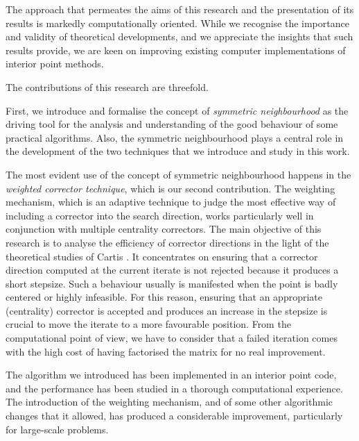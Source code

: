 The approach that permeates the aims of this research and 
the presentation of its results is markedly computationally oriented. 
While we recognise the importance and validity of theoretical developments, 
and we appreciate the insights that such results provide, 
we are keen on improving existing computer implementations of 
interior point methods.

The contributions of this research are threefold.

First, we introduce and formalise the concept of 
{\em symmetric neighbourhood} as the
driving tool for the analysis and understanding of the good behaviour
of some practical algorithms. 
Also, the symmetric neighbourhood plays a central role in the development 
of the two techniques that we introduce and study in this work.

The most evident use of the concept of symmetric neighbourhood
happens in the {\em weighted corrector technique},
which is our second contribution.
The weighting mechanism, which is an adaptive technique to judge the
most effective way of including a corrector into the search direction, 
works particularly well in conjunction with multiple centrality
correctors.
The main objective of this research is to analyse the efficiency of
corrector directions in the light of the theoretical studies of Cartis
\cite{Cartis04,Cartis05}. It concentrates on ensuring that a corrector
direction computed at the current iterate is not rejected because it
produces a short stepsize. Such a behaviour usually is manifested when
the point is badly centered or highly infeasible.
For this reason, ensuring that an appropriate (centrality) corrector
is accepted and produces an increase in the stepsize is crucial
to move the iterate to a more favourable position.
From the computational point of view, we have to consider that
a failed iteration comes with the high cost of having factorised
the matrix for no real improvement.

The algorithm we introduced has been implemented in an interior
point code, and the performance has been studied in a thorough
computational experience. The introduction of the weighting mechanism,
and of some other algorithmic changes that it allowed,
has produced a considerable improvement, particularly for large-scale
problems.

